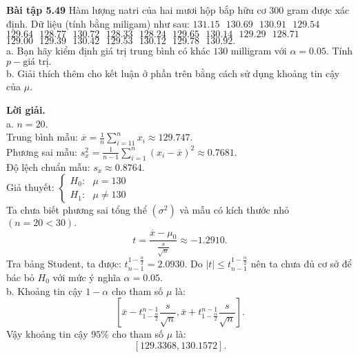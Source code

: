 \begin{mybox}
\textbf{Bài tập 5.49} Hàm lượng natri của hai mươi hộp bắp hữu cơ $300$ gram được xác định. Dữ liệu (tính bằng miligam) như sau: $131.15 \text{ } 130.69 \text{ } 130.91 \text{ } 129.54 \text{ } $ $129.64 \text{ } 128.77 \text{ } 130.72 \text{ } 128.33 \text{ } 128.24 \text{ } 129.65 \text{ } 130.14 \text{ } 129.29 \text{ } 128.71$ $129.00 \text{ } 129.39 \text{ } 130.42 \text{ } 129.53 \text{ } 130.12 \text{ } 129.78 \text{ } 130.92.$\\
a. Bạn hãy kiểm định giá trị trung bình có khác $130$ milligram với $\alpha = 0.05.$ Tính $p-\text{giá trị}.$\\
b. Giải thích thêm cho kết luận ở phần trên bằng cách sử dụng khoảng tin cậy của $\mu.$
\end{mybox}
\textbf{Lời giải.} \\
a. $n = 20.$\\
Trung bình mẫu:
$\overline x  = \frac{1}{n}\sum\limits_{i =1 1}^n {{x_i}}  \approx 129.747.$\\
Phương sai mẫu: $s_x^2 = \frac{1}{{n - 1}}\sum\limits_{i = 1}^n {{{\left( {{x_i} - \overline x } \right)}^2}}  \approx 0.7681.$\\
Độ lệch chuẩn mẫu: ${s_x} \approx 0.8764.$\\
Giả thuyết: $\begin{cases}
H_0: \text{ } \mu = 130\\
H_1: \text{ } \mu \ne 130
\end{cases} $ \\
Ta chưa biết phương sai tổng thể $\left( {\sigma^2} \right)$ và mẫu có kích thước nhỏ $\left( {n = 20 < 30} \right).$
$$t = \frac{\overline{x} - \mu_0}{\frac{s}{\sqrt{n}}} \approx -1.2910.$$
Tra bảng Student, ta được: $t_{n - 1}^{1 - \frac{\alpha}{2}} = 2.0930.$
Do $\left| t \right| \leqslant t_{n - 1}^{1 - \frac{\alpha}{2}}$ nên ta chưa đủ cơ sở để bác bỏ $H_0$ với mức ý nghĩa $\alpha = 0.05.$\\
b. Khoảng tin cậy $1 - \alpha$ cho tham số $\mu$ là:
$$\left[ {\overline x  - t_{1 - \frac{\alpha }{2}}^{n - 1}\frac{s}{{\sqrt n }},\overline x  + t_{1 - \frac{\alpha }{2}}^{n - 1}\frac{s}{{\sqrt n }}} \right].$$
Vậy khoảng tin cậy $95\%$ cho tham số $\mu$ là:
$$\left[ {129.3368, 130.1572} \right].$$

